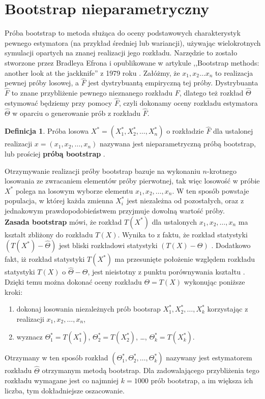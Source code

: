 \documentclass[inzynierska]{pwr_wmat_praca_dyplomowa}
\theoremstyle{plain}
\numberwithin{theorem}{chapter}
\theoremstyle{definition}
\numberwithin{theorem}{chapter}
\newtheorem{definition}[theorem]{Definicja}
\begin{document}
\section{Bootstrap nieparametryczny}
Próba bootstrap to metoda służąca do oceny podstawowych charakterystyk pewnego estymatora (na przykład średniej lub  wariancji), używając wielokrotnych symulacji opartych na znanej realizacji jego rozkładu. Narzędzie to zostało stworzone przez Bradleya Efrona i opublikowane w artykule ,,Bootstrap methods: another look at the jackknife'' z 1979 roku \cite{efron1}. Załóżmy, że $x_1, x_2 \dots x_n$ to realizacja pewnej próby losowej, a $\hat{F}$ jest dystrybuantą empiryczną tej próby. Dystrybuanta $\hat{F}$ to znane przybliżenie pewnego nieznanego rozkładu $F$, dlatego też rozkład $\hat{\Theta}$ estymować będziemy przy pomocy $\hat{F}$, czyli dokonamy oceny rozkładu estymatora $\hat{\Theta}$ w oparciu o generowanie prób z rozkładu $\hat{F}$.
\begin{definition}
	Próba losowa $X^* = (X_1^*, X_2^*, \dots, X_n^*)$ o rozkładzie $\hat{F}$ dla ustalonej realizacji $x = (x_1, x_2, \dots, x_n)$ nazywana jest nieparametryczną próbą bootstrap, lub prościej \textbf{próbą bootstrap} \cite{koronacki}.
\end{definition}
Otrzymywanie realizacji próby bootstrap bazuje na wykonaniu $n$-krotnego losowania ze zwracaniem elementów próby pierwotnej, tak więc losowość w próbie $X^*$ polega na losowym wyborze elementu $x_1, x_2, \dots, x_n$. W ten sposób powstaje populacja, w której każda zmienna $X_i^*$ jest niezależna od pozostałych, oraz z jednakowym prawdopodobieństwem  przyjmuje dowolną wartość próby. \\
\hspace*{6mm}\textbf{Zasada bootstrap} mówi, że rozkład $T(X^*)$ dla ustalonych $x_1, x_2, \dots, x_n$ ma kształt zbliżony do rozkładu $T(X)$. Wynika to z faktu, że rozkład statystyki $(T(X^*)-\hat{\Theta})$ jest bliski rozkładowi statystyki $(T(X)-\Theta)$ \cite{bootstrap1}. Dodatkowo fakt, iż rozkład statystyki $T(X^*)$ ma przesunięte położenie względem rozkładu statystyki $T(X)$ o $\hat{\Theta}-\Theta$, jest nieistotny z punktu porównywania kształtu \cite{koronacki}. Dzięki temu można dokonać oceny rozkładu $\Theta=T(X)$ wykonując poniższe kroki:
\begin{enumerate}
	\item dokonaj losowania niezależnych prób bootsrap $X_1^*, X_2^*, \dots, X_k^*$ korzystając z realizacji $x_1, x_2, \dots, x_n$,
	\item wyznacz $\Theta_1^*=T(X_1^*)$, $\Theta_2^*=T(X_2^*)$, \dots, $\Theta_k^*=T(X_k^*)$.
\end{enumerate}
Otrzymany w ten sposób rozkład $(\Theta_1^*, \Theta_2^*, \dots, \Theta_k^*)$  nazywany jest estymatorem rozkładu $\hat{\Theta}$ otrzymanym metodą bootstrap. Dla zadowalającego przybliżenia tego rozkładu wymagane jest co najmniej $k=1000$ prób bootstrap, a im większa ich liczba, tym dokładniejsze oszacowanie.  
\end{document}
